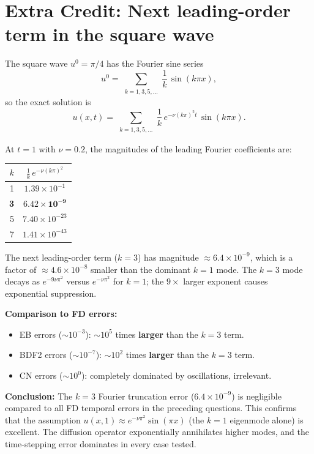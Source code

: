 \documentclass[11pt]{article}
\begin{document}
\newpage
\section*{Extra Credit: Next leading-order term in the square wave}

The square wave $u^0 = \pi/4$ has the Fourier sine series
\[
  u^0 = \sum_{\substack{k=1,3,5,\ldots}} \frac{1}{k}\,\sin(k\pi x),
\]
so the exact solution is
\[
  u(x,t) = \sum_{\substack{k=1,3,5,\ldots}} \frac{1}{k}\,
            e^{-\nu(k\pi)^2 t}\,\sin(k\pi x).
\]

At $t=1$ with $\nu = 0.2$, the magnitudes of the leading Fourier coefficients are:

\begin{table}[h!]
\centering
\begin{tabular}{rc}
\toprule
$k$ & $\displaystyle\frac{1}{k}\,e^{-\nu(k\pi)^2}$ \\
\midrule
1 & $1.39 \times 10^{-1}$ \\
\textbf{3} & $\mathbf{6.42 \times 10^{-9}}$ \\
5 & $7.40 \times 10^{-23}$ \\
7 & $1.41 \times 10^{-43}$ \\
\bottomrule
\end{tabular}
\end{table}

\noindent
The next leading-order term ($k=3$) has magnitude
$\approx 6.4 \times 10^{-9}$, which is a factor of
$\approx 4.6 \times 10^{-8}$ smaller than the dominant $k=1$ mode.
The $k=3$ mode decays as $e^{-9\nu\pi^2}$ versus $e^{-\nu\pi^2}$ for $k=1$;
the $9\times$ larger exponent causes exponential suppression.

\medskip\noindent\textbf{Comparison to FD errors:}
\begin{itemize}[nosep]
  \item EB errors ($\sim 10^{-3}$): $\sim 10^5$ times \textbf{larger} than the $k=3$ term.
  \item BDF2 errors ($\sim 10^{-7}$): $\sim 10^2$ times \textbf{larger} than the $k=3$ term.
  \item CN errors ($\sim 10^{0}$): completely dominated by oscillations, irrelevant.
\end{itemize}

\medskip\noindent\textbf{Conclusion:}
The $k=3$ Fourier truncation error ($6.4 \times 10^{-9}$) is negligible compared to
all FD temporal errors in the preceding questions. This confirms that the assumption
$u(x,1) \approx e^{-\nu\pi^2}\sin(\pi x)$ (the $k=1$ eigenmode alone) is excellent.
The diffusion operator exponentially annihilates higher modes, and the time-stepping
error dominates in every case tested.
\end{document}
